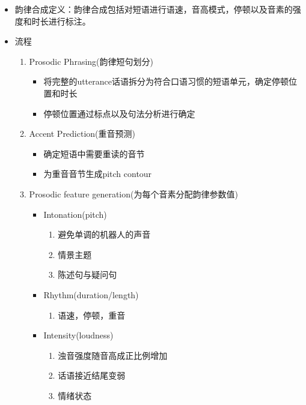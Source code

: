 \documentclass[UTF8]{ctexart}
\begin{document}
\begin{itemize}
    \item 韵律合成定义：韵律合成包括对短语进行语速，音高模式，停顿以及音素的强度和时长进行标注。
    \item 流程
    \begin{enumerate}
        \item Prosodic Phrasing(韵律短句划分)
        \begin{itemize}
            \item 将完整的utterance话语拆分为符合口语习惯的短语单元，确定停顿位置和时长
            \item 停顿位置通过标点以及句法分析进行确定
        \end{itemize}
        \item Accent Prediction(重音预测)
        \begin{itemize}
            \item 确定短语中需要重读的音节
            \item 为重音音节生成pitch contour
        \end{itemize}
        \item Prosodic feature generation(为每个音素分配韵律参数值)
        \begin{itemize}
            \item Intonation(pitch)
            \begin{enumerate}
                \item 避免单调的机器人的声音
                \item 情景主题
                \item 陈述句与疑问句
            \end{enumerate}
            \item Rhythm(duration/length)
            \begin{enumerate}
                \item 语速，停顿，重音
            \end{enumerate}
            \item Intensity(loudness)
            \begin{enumerate}
                \item 浊音强度随音高成正比例增加
                \item 话语接近结尾变弱
                \item 情绪状态
            \end{enumerate}
        \end{itemize}
    \end{enumerate}
\end{itemize}
\end{document}
